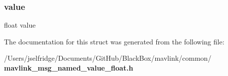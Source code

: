 \mbox{\label{struct____mavlink__named__value__float__t_a17956fe0129d3d4c94ebc06cfef2ad82}} 
\subsubsection{value}
{\footnotesize\ttfamily float value}



The documentation for this struct was generated from the following file\+:\begin{DoxyCompactItemize}
\item 
/\+Users/jselfridge/\+Documents/\+Git\+Hub/\+Black\+Box/mavlink/common/\textbf{ mavlink\+\_\+msg\+\_\+named\+\_\+value\+\_\+float.\+h}\end{DoxyCompactItemize}
